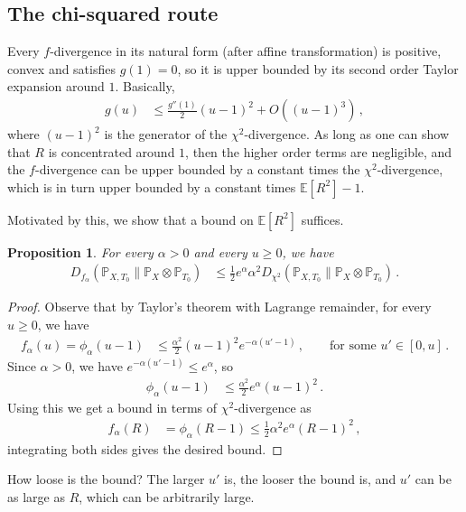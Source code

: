 \documentclass{article}
\theoremstyle{plain}
\newtheorem{proposition}[theorem]{Proposition}
\theoremstyle{definition}
\theoremstyle{plain}
\newcommand{\E}{\mathbb E}
\newcommand{\PP}{\mathbb P}
\begin{document}
\subsection{The chi-squared route}
Every $f$-divergence in its natural form (after affine transformation) is positive, convex and satisfies $g(1) = 0$, so it is upper bounded by its second order Taylor expansion around $1$.
Basically,
\begin{align}
    g(u) & \leq \frac{g''(1)}{2} (u - 1)^2 + O((u - 1)^3)\,,
\end{align}
where $(u-1)^2$ is the generator of the $\chi^2$-divergence.
As long as one can show that $R$ is concentrated around $1$, then the higher order terms are negligible, and the $f$-divergence can be upper bounded by a constant times the $\chi^2$-divergence, which is in turn upper bounded by a constant times $\E[R^2] - 1$.

Motivated by this, we show that a bound on $\E[R^2]$ suffices.
\begin{proposition}
    \label{prop:appendix_f_chi_squared_bound}
    For every $\alpha > 0$ and every $u \geq 0$, we have
    \begin{align}
        D_{f_{\alpha}}(\PP_{X, T_0}\|\PP_X \otimes \PP_{T_0}) & \leq
        \frac{1}{2}
        e^{\alpha}
        \alpha^2
        D_{\chi^2}(\PP_{X, T_0}\|\PP_X \otimes \PP_{T_0})\,.
    \end{align}
\end{proposition}
\begin{proof}
    Observe that by Taylor's theorem with Lagrange remainder, for every $u \geq 0$, we have
    \begin{align}
        f_\alpha(u) = \phi_\alpha(u-1) & \leq \frac{\alpha^2}{2} (u - 1)^2 e^{-\alpha(u'-1)}\,, \qquad\text{for some } u' \in [0, u]\,.
    \end{align}
    Since $\alpha > 0$, we have $e^{-\alpha(u'-1)} \leq e^{\alpha}$, so
    \begin{align}
        \phi_\alpha(u-1) & \leq \frac{\alpha^2}{2} e^{\alpha} (u - 1)^2\,.
        \label{eq:f_eta_lambda_chi_squared_bound}
    \end{align}
    Using this we get a bound in terms of $\chi^2$-divergence as
    \begin{align}
        f_{\alpha}(R) & =
        \phi_\alpha(R - 1)
        \leq
        \frac{1}{2}
        \alpha^2
        e^{\alpha}
        (R - 1)^2\,,
    \end{align}
    integrating both sides gives the desired bound.
\end{proof}
How loose is the bound?
The larger $u'$ is, the looser the bound is, and $u'$ can be as large as $R$, which can be arbitrarily large.
\end{document}
